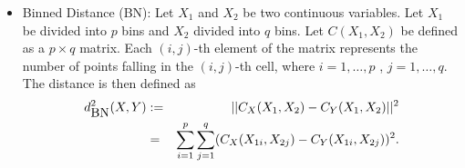 \documentclass[12]{article}
\newcommand{\red}[1]{{\color{red} #1}}
\begin{document}
\begin{itemize}
\item Binned Distance (BN):
Let $X_1$ and $X_2$ be two continuous variables. Let $X_1$ be divided into $p$ bins and $X_2$ divided into $q$ bins. %
 Let $C(X_1,X_2)$ be defined as a $p \times q$ matrix. Each $(i,j)$-th element of the matrix represents the number of points falling in the $(i,j)$-th cell, where $i = 1, \dots, p$ , $j = 1, \dots, q$.
The distance is then defined as
\begin{eqnarray*}
d_{\hbox{BN}}^2 (X, Y) &:=& ||C_X(X_1, X_2) - C_Y(X_1,X_2)||^2 \\ &=& \sum_{i=1}^p \sum_{j=1}^q (C_X(X_{1i},X_{2j}) - C_Y(X_{1i},X_{2j}))^2.
\end{eqnarray*}



\end{itemize}
\end{document}
